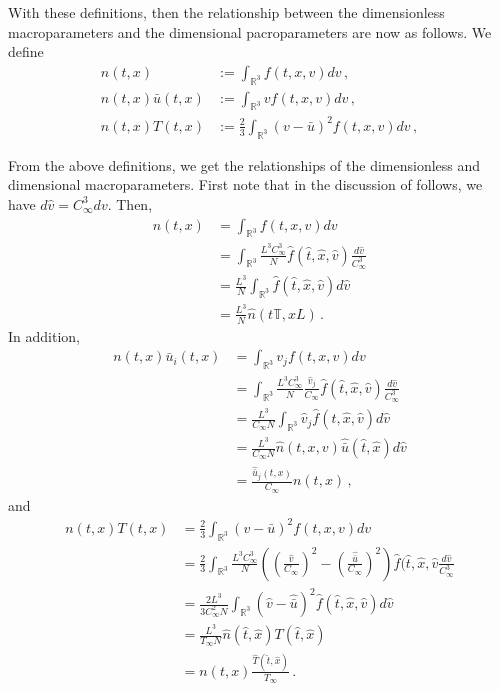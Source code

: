 \documentclass[12pt]{CSUNthesis}
\def\T{\mathbb{T}}
\def\R{\mathbb{R}}
\newcommand{\Tref}{T_{\infty}}
\newcommand{\Cref}{C_{\infty}}
\def\T{\mathbb{T}}
\def\R{\mathbb{R}}
\begin{document}
With these definitions, then the relationship between the dimensionless macroparameters and the dimensional pacroparameters are now as follows. We define
\begin{equation}
\begin{split}
\label{eq:dimless_macro}
n(t,x)&:=\int_{\R^3} f(t,x,v)  dv\, ,  \\
n(t,x)\bar{u}(t,x)&:=\int_{\R^3} vf(t,x,v) dv\,  ,  \\
n(t,x)T(t,x)&:=\frac{2}{3} \int_{\R^3} (v - \bar{u})^2 f(t,x,v) dv\, , 
\end{split}
\end{equation}

From the above definitions, we get the relationships of the dimensionless and dimensional macroparameters. First note that in the discussion of follows, we have $d\hat{v} = C_{\infty}^3 dv$. Then,
\begin{equation}
\begin{split}
n(t,x) &= \int_{\R^3} f(t,x,v)  dv\, \\
&= \int_{\R^3} \frac{L^3 \Cref^3}{N} \hat{f}(\hat{t},\hat{x},\hat{v})\frac{d\hat{v}}{\Cref^3} \\
&= \frac{L^3}{N}  \int_{\R^3}  \hat{f}(\hat{t},\hat{x},\hat{v}) d\hat{v}\\
&= \frac{L^3}{N} \hat{n}(t\T,xL)\, .
\end{split}
\end{equation}
In addition,
\begin{equation}
\begin{split}
n(t,x) \bar{u}_i(t,x) &= \int_{\R^3} v_j f(t,x,v)  dv\, \\
&= \int_{\R^3} \frac{L^3 \Cref^3}{N} \frac{\hat{v}_j}{\Cref} \hat{f}(\hat{t},\hat{x},\hat{v})\frac{d\hat{v}}{\Cref^3} \\
&= \frac{L^3}{\Cref N}  \int_{\R^3} \hat{v}_j  \hat{f}(\hat{t},\hat{x},\hat{v}) d\hat{v}\\
&= \frac{L^3}{\Cref N} \hat{n}(t,x,v) \hat{\bar{u}}(\hat{t},\hat{x}) d\hat{v} \\
&= \frac{\hat{\bar{u}}_j(t,x)}{\Cref}n(t,x)\, ,
\end{split}
\end{equation}
and
\begin{equation}
\begin{split}
n(t,x)T(t,x) &= \frac{2}{3} \int_{\R^3}(v-\bar{u})^2 f(t,x,v)dv \\
&= \frac{2}{3} \int_{\R^3} \frac{L^3 \Cref^3}{N} \left( \left( \frac{\hat{v}}{\Cref} \right)^2 - \left( \frac{\hat{\bar{u}}}{\Cref} \right)^2 \right)\hat{f}(\hat{t},\hat{x},\hat{v} \frac{d\hat{v}}{\Cref^3} \\
&= \frac{2L^3}{3 \Cref^2 N} \int_{\R^3} (\hat{v} - \hat{\bar{u}})^2\hat{f}(\hat{t},\hat{x},\hat{v}) d\hat{v} \\
&= \frac{L^3}{\Tref N }\hat{n}(\hat{t},\hat{x}) T(\hat{t},\hat{x}) \\ 
&= n(t,x) \frac{\hat{T}(\hat{t},\hat{x})}{\Tref} \, .\\
\end{split}
\end{equation}
\end{document}

